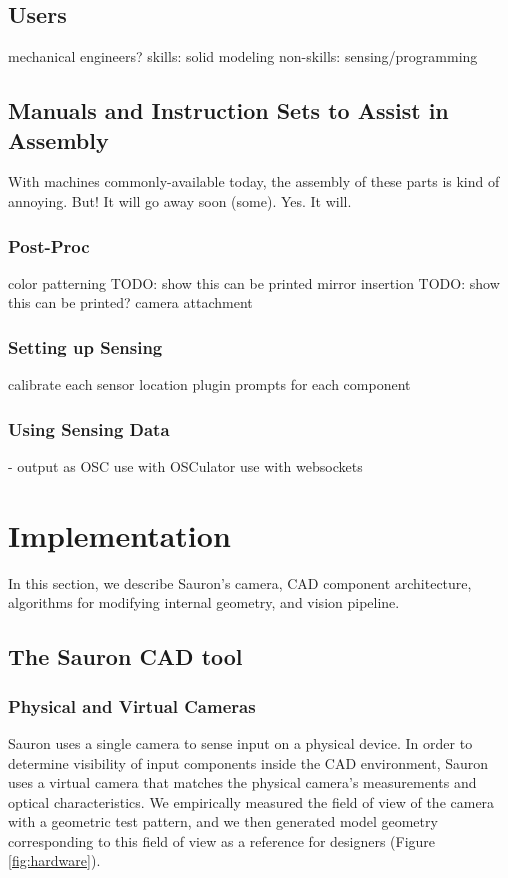     \subsection{Users}
    
    mechanical engineers?
skills:
solid modeling
non-skills:
sensing/programming


    \subsection{Manuals and Instruction Sets to Assist in Assembly}
    
    With machines commonly-available today, the assembly of these parts is kind of annoying. But! It will go away soon (some). Yes. It will.

        \subsubsection{Post-Proc}
        color patterning
TODO: show this can be printed
mirror insertion
TODO: show this can be printed?
camera attachment


        \subsubsection{Setting up Sensing}
        calibrate each sensor location
plugin prompts for each component


        \subsubsection{Using Sensing Data}
 - output as OSC
use with OSCulator
use with websockets

\section{Implementation}

In this section, we describe Sauron's camera, CAD component architecture, algorithms for modifying internal geometry, and vision pipeline. 


    \subsection{The Sauron CAD tool}
    
    

\subsubsection{Physical and Virtual Cameras}
Sauron uses a single camera to sense input on a physical device. In order to determine visibility of input components inside the CAD environment, Sauron uses a virtual camera that matches the physical camera's measurements and optical characteristics. We empirically measured the field of view of the camera with a geometric test pattern, and we then generated model geometry corresponding to this field of view as a reference for designers (Figure \ref{fig:hardware}).

